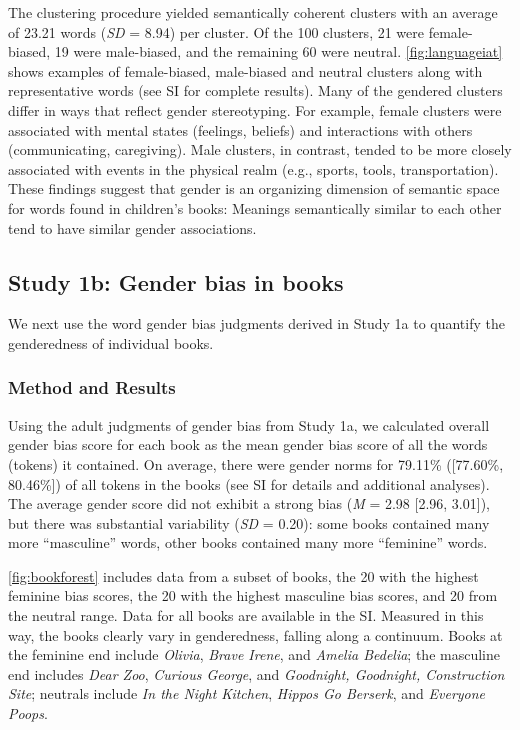 \documentclass[
  english,
  ,man,floatsintext]{apa6}
\begin{document}
The clustering procedure yielded semantically coherent clusters with an average of 23.21 words (\emph{SD} = 8.94) per cluster. Of the 100 clusters, 21 were female-biased, 19 were male-biased, and the remaining 60 were neutral. \autoref{fig:languageiat} shows examples of female-biased, male-biased and neutral clusters along with representative words (see SI for complete results). Many of the gendered clusters differ in ways that reflect gender stereotyping. For example, female clusters were associated with mental states (feelings, beliefs) and interactions with others (communicating, caregiving). Male clusters, in contrast, tended to be more closely associated with events in the physical realm (e.g., sports, tools, transportation). These findings suggest that gender is an organizing dimension of semantic space for words found in children's books: Meanings semantically similar to each other tend to have similar gender associations.

\hypertarget{study-1b-gender-bias-in-books}{%
\subsection{Study 1b: Gender bias in books}\label{study-1b-gender-bias-in-books}}

We next use the word gender bias judgments derived in Study 1a to quantify the genderedness of individual books.

\hypertarget{method-and-results}{%
\subsubsection{Method and Results}\label{method-and-results}}

Using the adult judgments of gender bias from Study 1a, we calculated overall gender bias score for each book as the mean gender bias score of all the words (tokens) it contained. On average, there were gender norms for 79.11\% ({[}77.60\%, 80.46\%{]}) of all tokens in the books (see SI for details and additional analyses). The average gender score did not exhibit a strong bias (\emph{M} = 2.98 {[}2.96, 3.01{]}), but there was substantial variability (\emph{SD} = 0.20): some books contained many more \enquote{masculine} words, other books contained many more \enquote{feminine} words.

\autoref{fig:bookforest} includes data from a subset of books, the 20 with the highest feminine bias scores, the 20 with the highest masculine bias scores, and 20 from the neutral range. Data for all books are available in the SI. Measured in this way, the books clearly vary in genderedness, falling along a continuum. Books at the feminine end include \emph{Olivia}, \emph{Brave Irene}, and \emph{Amelia Bedelia}; the masculine end includes \emph{Dear Zoo}, \emph{Curious George}, and \emph{Goodnight, Goodnight, Construction Site}; neutrals include \emph{In the Night Kitchen}, \emph{Hippos Go Berserk}, and \emph{Everyone Poops}.
\end{document}
